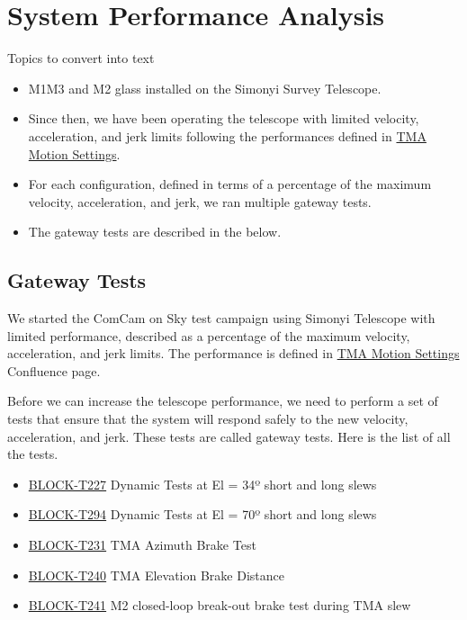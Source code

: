\section{System Performance Analysis}
\label{sec:system_performance_analysis}

\newcommand{\TMAMotionSettings}{\href{https://rubinobs.atlassian.net/wiki/spaces/LSSTCOM/pages/53741249/TMA+Motion+Settings}{TMA Motion Settings}\xspace}
\newcommand{\testCase}[1]{\href{https://rubinobs.atlassian.net/projects/BLOCK?selectedItem=com.atlassian.plugins.atlassian-connect-plugin:com.kanoah.test-manager__main-project-page\#!/v2/testCase/#1}{#1}}

Topics to convert into text

\begin{itemize}
    \item M1M3 and M2 glass installed on the Simonyi Survey Telescope.
    \item Since then, we have been operating the telescope with limited velocity,
    acceleration, and jerk limits following the performances defined in \TMAMotionSettings.
    \item For each configuration, defined in terms of a percentage of the maximum
    velocity, acceleration, and jerk, we ran multiple gateway tests.
    \item The gateway tests are described in the  below.
\end{itemize}

\subsection{Gateway Tests}
\label{sec:gateway_tests}

We started the ComCam on Sky test campaign using Simonyi Telescope with limited
performance, described as a percentage of the maximum velocity, acceleration,
and jerk limits. The performance is defined in \TMAMotionSettings Confluence page.

Before we can increase the telescope performance, we need to perform a set of
tests that ensure that the system will respond safely to the new velocity, acceleration,
and jerk. These tests are called gateway tests. Here is the list of all the tests.

\begin{itemize}
    \item \testCase{BLOCK-T227} Dynamic Tests at El = 34º short and long slews
    \item \testCase{BLOCK-T294} Dynamic Tests at El = 70º short and long slews
    \item \testCase{BLOCK-T231} TMA Azimuth Brake Test
    \item \testCase{BLOCK-T240} TMA Elevation Brake Distance
    \item \testCase{BLOCK-T241} M2 closed-loop break-out brake test during TMA slew
\end{itemize}


